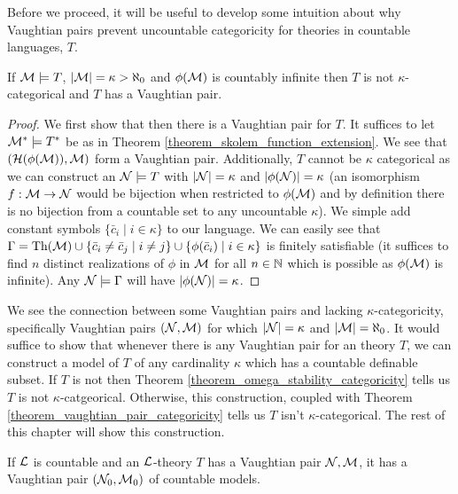 Before we proceed, it will be useful to develop some intuition about why Vaughtian pairs prevent uncountable categoricity for theories in countable languages, \(T\).
\begin{theorem}\label{theorem_vaughtian_pair_categoricity}
If \(\mathcal{M} \models T\), \(|\mathcal{M}| = \kappa > \aleph_0\) and \(\phi(\mathcal{M})\) is countably infinite then \(T\) is not \(\kappa\)-categorical and \(T\) has a Vaughtian pair. 
\end{theorem}

\begin{proof}
We first show that then there is a Vaughtian pair for \(T\).
It suffices to let \(\mathcal{M}^* \models T^*\) be as in Theorem \ref{theorem_skolem_function_extension}.
We see that \((\mathcal{H}(\phi(\mathcal{M})), \mathcal{M})\) form a Vaughtian pair. 
Additionally, \(T\) cannot be \(\kappa\) categorical as we can construct an \(\mathcal{N} \models T\) with \(|\mathcal{N}| = \kappa\) and \(|\phi(\mathcal{N})| = \kappa\) (an isomorphism \(f: \mathcal{M} \to \mathcal{N}\) would be bijection when restricted to \(\phi(\mathcal{M})\) and by definition there is no bijection from a countable set to any uncountable \(\kappa\)).
We simple add constant symbols \(\{\bar{c}_i \mid i \in \kappa\}\) to our language. 
We can easily see that \(\Gamma = \text{Th}(\mathcal{M}) \cup \{\bar{c}_i \neq \bar{c}_j \mid i \neq j\} \cup \{\phi(\bar{c}_i) \mid i \in \kappa\}\) is finitely satisfiable (it suffices to find \(n\) distinct realizations of \(\phi\) in \(\mathcal{M}\) for all \(n \in \mathbb{N}\) which is possible as \(\phi(\mathcal{M})\) is infinite). 
Any \(\mathcal{N} \models \Gamma\) will have \(|\phi(\mathcal{N})| = \kappa\). 
\end{proof}

We see the connection between some Vaughtian pairs and lacking \(\kappa\)-categoricity, specifically Vaughtian pairs \((\mathcal{N}, \mathcal{M})\) for which \(|\mathcal{N}| = \kappa\) and \(|\mathcal{M}| = \aleph_0\).
It would suffice to show that whenever there is any Vaughtian pair for an \omst theory \(T\), we can construct a model of \(T\) of any cardinality \(\kappa\) which has a countable definable subset. 
If \(T\) is not \omst then Theorem \ref{theorem_omega_stability_categoricity} tells us \(T\) is not \(\kappa\)-catgeorical.
Otherwise, this construction, coupled with Theorem \ref{theorem_vaughtian_pair_categoricity} tells us \(T\) isn't \(\kappa\)-categorical.
The rest of this chapter will show this construction. 

\begin{theorem}\label{theorem_countable_vaughtian_pairs}
If \(\mathcal{L}\) is countable and an \(\mathcal{L}\)-theory \(T\) has a Vaughtian pair \(\mathcal{N}, \mathcal{M}\), it has a Vaughtian pair \((\mathcal{N}_0, \mathcal{M}_0)\) of countable models. 
\end{theorem}

